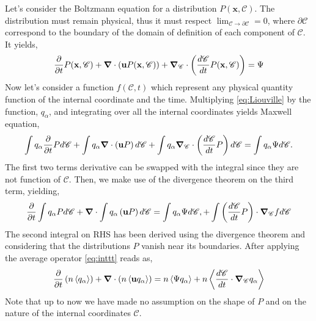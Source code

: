 Let's consider the Boltzmann equation for a distribution $P(\textbf{x},\mathscr{C})$.
The distribution must remain physical, thus it must respect $\lim_{\mathscr{C} \rightarrow \partial\mathscr{C}} = 0$, where $\partial \mathscr{C}$ correspond to the boundary of the domain of definition of each component of $\mathscr{C}$. 
It yields, 
\begin{equation}
    \label{eq:Liouville}
    \frac{\partial}{\partial t} P(\textbf{x},\mathscr{C})
    + \bm{\nabla} \cdot \left(\textbf{u} P(\textbf{x},\mathscr{C})\right)
    + \bm{\nabla}_\mathscr{C} \cdot \left(\frac{d\mathscr{C}}{dt} P(\textbf{x},\mathscr{C})\right) 
    = \Psi
\end{equation}
Now let's consider a function $f(\mathscr{C},t)$ which represent any physical quantity function of the internal coordinate and the time. 
Multiplying \ref{eq:Liouville} by the function, $q_\alpha$, and integrating over all the internal coordinates yields Maxwell equation,
\begin{equation}
    \int q_\alpha \frac{\partial}{\partial t} P d\mathscr{C}
    + \int q_\alpha \bm{\nabla} \cdot \left(\textbf{u} P\right)d\mathscr{C}
    + \int q_\alpha \bm{\nabla}_\mathscr{C} \cdot \left(\frac{d\mathscr{C}}{dt} P\right) d\mathscr{C} = \int q_\alpha \Psi d\mathscr{C}.
\end{equation}
The first two terms derivative can be swapped with the integral since they are not function of $\mathscr{C}$.
Then, we make use of the divergence theorem on the third term, 
yielding,
\begin{multline}
    \frac{\partial}{\partial t} \int q_\alpha  P d\mathscr{C}
    + \bm{\nabla} \cdot\int q_\alpha \left(\textbf{u} P\right)d\mathscr{C} 
    = \int q_\alpha \Psi d\mathscr{C},
    +\int \left(\frac{d\mathscr{C}}{dt} P\right) \cdot \bm{\nabla}_\mathscr{C} f  d\mathscr{C} 
    \label{eq:inttt}
\end{multline}
The second integral on RHS has been derived using the divergence theorem and considering that the distributions $P$ vanish near its boundaries. 
After applying the average operator \ref{eq:inttt} reads as,
\begin{equation}
    \frac{\partial}{\partial t} \left( n \left<q_\alpha\right>\right)
    + \bm{\nabla} \cdot \left(n \left<\textbf{u} q_\alpha\right>\right)
    = n \left<\Psi q_\alpha\right>
    + n  \left<\frac{d\mathscr{C}}{dt} \cdot \bm{\nabla}_\mathscr{C} q_\alpha\right>
    \label{ap:eq:maxwell}
\end{equation}
Note that up to now we have made no assumption on the shape of $P$ and on the nature of the internal coordinates $\mathscr{C}$. 
